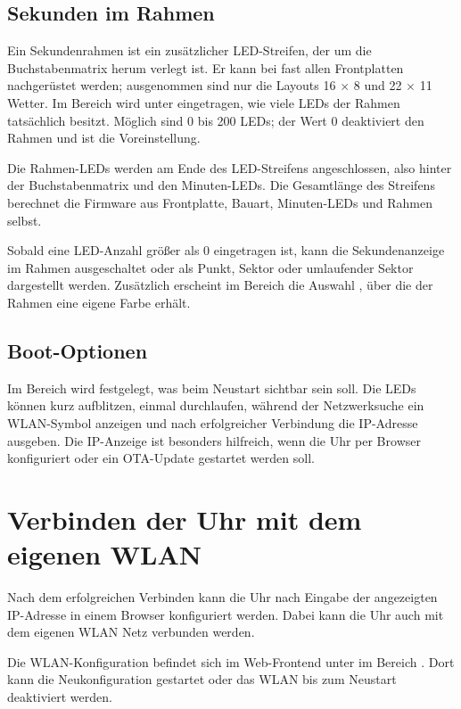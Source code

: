 \documentclass[12pt,a4paper, german,oneside, headinclude, headsepline,plainheadsepline,BCOR20mm, DIV18,parskip=half, openright, numbers=noenddot, captions=tableheading,version=first,listof=totoc,version=first]{scrbook}
\begin{document}
\subsection{Sekunden im Rahmen}

Ein Sekundenrahmen ist ein zusätzlicher LED-Streifen, der um die Buchstabenmatrix herum verlegt ist. Er kann bei fast allen Frontplatten nachgerüstet werden; ausgenommen sind nur die Layouts 16 \(\times\) 8 und 22 \(\times\) 11 Wetter. Im Bereich  wird unter  eingetragen, wie viele LEDs der Rahmen tatsächlich besitzt. Möglich sind 0 bis 200 LEDs; der Wert 0 deaktiviert den Rahmen und ist die Voreinstellung.

Die Rahmen-LEDs werden am Ende des LED-Streifens angeschlossen, also hinter der Buchstabenmatrix und den Minuten-LEDs. Die Gesamtlänge des Streifens berechnet die Firmware aus Frontplatte, Bauart, Minuten-LEDs und Rahmen selbst.

Sobald eine LED-Anzahl größer als 0 eingetragen ist, kann die Sekundenanzeige im Rahmen ausgeschaltet oder als Punkt, Sektor oder umlaufender Sektor dargestellt werden. Zusätzlich erscheint im Bereich  die Auswahl , über die der Rahmen eine eigene Farbe erhält.

\subsection{Boot-Optionen}

Im Bereich  wird festgelegt, was beim Neustart sichtbar sein soll. Die LEDs können kurz aufblitzen, einmal durchlaufen, während der Netzwerksuche ein WLAN-Symbol anzeigen und nach erfolgreicher Verbindung die IP-Adresse ausgeben. Die IP-Anzeige ist besonders hilfreich, wenn die Uhr per Browser konfiguriert oder ein OTA-Update gestartet werden soll.

\section{Verbinden der Uhr mit dem eigenen WLAN}
Nach dem erfolgreichen Verbinden kann die Uhr nach Eingabe der angezeigten IP-Adresse in einem Browser konfiguriert werden. Dabei kann die Uhr auch mit dem eigenen WLAN Netz verbunden werden.

Die WLAN-Konfiguration befindet sich im Web-Frontend unter  im Bereich . Dort kann die Neukonfiguration gestartet oder das WLAN bis zum Neustart deaktiviert werden.
\end{document}
